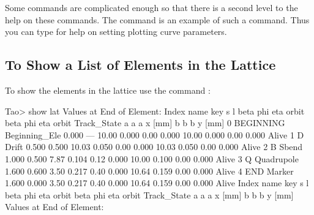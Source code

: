 \documentclass{hitec}
\begin{document}
Some commands are complicated enough so that there is a second level to the help on these commands.
The  command is an example of such a command. Thus you can type  for
help on setting plotting curve parameters.

\subsection{To Show a List of Elements in the Lattice}

To show the elements in the lattice use the command :
\begin{code}
Tao> show lat
      Values at End of Element:
 Index  name      key                       s       l    beta     phi    eta  orbit     beta     phi    eta  orbit    Track_State
                                                            a       a      a  x [mm]       b       b      b  y [mm]
     0  BEGINNING Beginning_Ele         0.000     ---   10.00   0.000   0.00   0.000   10.00   0.000   0.00   0.000   Alive
     1  D         Drift                 0.500   0.500   10.03   0.050   0.00   0.000   10.03   0.050   0.00   0.000   Alive
     2  B         Sbend                 1.000   0.500    7.87   0.104   0.12   0.000   10.00   0.100   0.00   0.000   Alive
     3  Q         Quadrupole            1.600   0.600    3.50   0.217   0.40   0.000   10.64   0.159   0.00   0.000   Alive
     4  END       Marker                1.600   0.000    3.50   0.217   0.40   0.000   10.64   0.159   0.00   0.000   Alive
 Index  name      key                       s       l    beta     phi    eta  orbit     beta     phi    eta  orbit    Track_State
                                                            a       a      a  x [mm]       b       b      b  y [mm]
      Values at End of Element:
\end{code}
\end{document}
